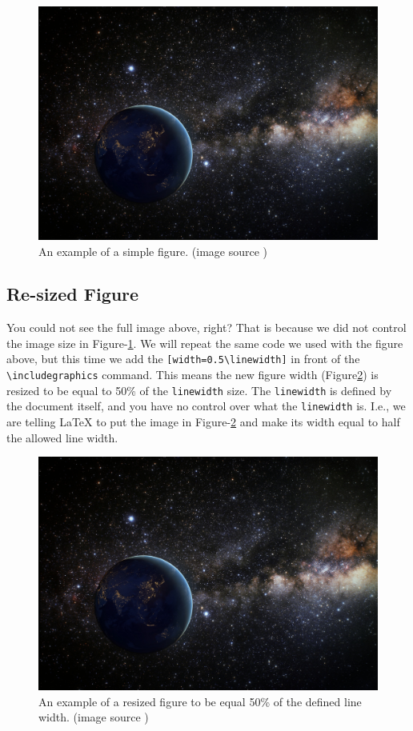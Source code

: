 \begin{figure}[H]
    \begin{center}
        \includegraphics{figures/samples/earth-in-space.jpg}
        \caption{An example of a simple figure. (image source \cite{pdp:23})}
        \label{ref:simple-figure}
    \end{center}
\end{figure}


\subsection{Re-sized Figure}

You could not see the full image above, right? That is because we did not control the image size in Figure-\ref{ref:simple-figure}. We will repeat the same code we used with the figure above, but this time we add the \verb|[width=0.5\linewidth]| in front of the \verb|\includegraphics| command. This means the new figure width (Figure\ref{ref:resized-figure}) is resized to be equal to 50\% of the \verb|linewidth| size. The \verb|linewidth| is defined by the document itself, and you have no control over what the \verb|linewidth| is. I.e., we are telling {\LaTeX} to put the image in Figure-\ref{ref:resized-figure} and make its width equal to half the allowed line width.

\begin{figure}[H]
    \begin{center}
        \includegraphics[width=0.5\linewidth]{figures/samples/earth-in-space.jpg}
        \caption{An example of a resized figure to be equal 50\% of the defined line width. (image source \cite{pdp:23})}
        \label{ref:resized-figure}
    \end{center}
\end{figure}

